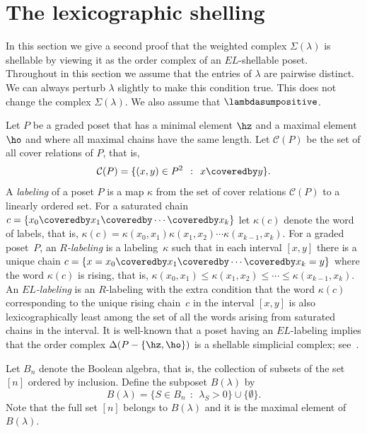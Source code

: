 \section{The lexicographic shelling}
\label{section_lexicographic_shelling}


In this section we give a second proof that the weighted complex
$\Sigma(\lambda)$ is shellable by viewing it as the order
complex of an $EL$-shellable poset.
Throughout in this section we assume that the entries of $\lambda$
are pairwise distinct. We can always perturb $\lambda$
slightly to make this condition true. This does not
change the complex $\Sigma(\lambda)$.
We also assume that $\lambdasumpositive$.



Let $P$ be a graded poset  that 
has a minimal element $\hz$ and a maximal element $\ho$
and where all maximal chains have the same length.
Let $\mathcal{C}(P)$ be the set of all cover relations of $P$,
that is,
$$ \mathcal{C}(P) = \{(x,y) \in P^{2} \:\: : \:\: x \coveredby y\} . $$
A \emph{labeling} of a poset $P$ is a map
$\kappa$ from the set of cover relations $\mathcal{C}(P)$
to a linearly ordered set.
For a saturated chain
$c = \{x_{0} \coveredby x_{1} \coveredby \cdots \coveredby x_{k}\}$
let $\kappa(c)$
denote the word of labels, that is,
$\kappa(c) = 
\kappa(x_{0},x_{1}) \kappa(x_{1},x_{2}) \cdots \kappa(x_{k-1},x_{k})$.
For a graded poset~$P$,
an \emph{$R$-labeling} is a labeling~$\kappa$
such that in each interval $[x,y]$ there is a unique chain
$c = \{x = x_{0} \coveredby x_{1} \coveredby \cdots \coveredby x_{k} = y\}$
where the word $\kappa(c)$ is rising, that is,
$\kappa(x_{0},x_{1}) \leq \kappa(x_{1},x_{2}) \leq \cdots \leq
\kappa(x_{k-1},x_{k})$.
An \emph{$EL$-labeling} is an $R$-labeling with the extra condition
that the word $\kappa(c)$
corresponding to the
unique rising chain~$c$ in the interval $[x,y]$
is also lexicographically least
among the set of
all the words arising from saturated chains in the interval.
It is
well-known that
a poset
having an $EL$-labeling
implies that the order complex $\Delta(P - \{\hz,\ho\})$
is a shellable simplicial complex; see~\cite[Section~2]{Bjorner}.



Let $B_{n}$ denote the Boolean algebra,
that is, the collection of subsets of the set $[n]$
ordered by inclusion.
Define the subposet $B(\lambda)$
by 
$$ B(\lambda) = \{ S \in B_{n} \:\: : \:\: \lambda_{S} > 0\} \cup \{\emptyset\}. $$
Note that the full set $[n]$
belongs to $B(\lambda)$ and it is the maximal element of $B(\lambda)$.

